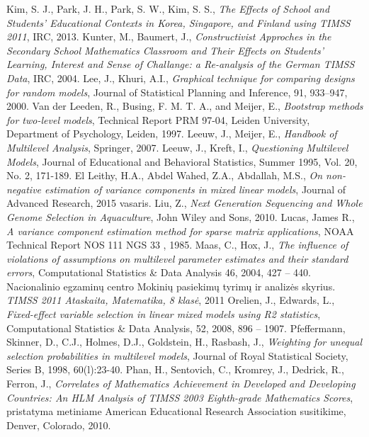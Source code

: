 \documentclass[12pt,a4paper]{article}
\begin{document}
\begin{thebibliography}{1}
 Kim, S. J., Park, J. H., Park, S. W., Kim, S. S., \textit{The Effects of School and Students’ Educational Contexts in Korea, Singapore, and Finland using TIMSS 2011}, IRC, 2013.
 Kunter, M., Baumert, J., \textit{Constructivist Approches in the Secondary School Mathematics Classroom and Their Effects on Students' Learning, Interest and Sense of Challange: a Re-analysis of the German TIMSS Data}, IRC, 2004.
Lee, J., Khuri, A.I., \textit{Graphical technique for comparing designs for random models}, Journal of Statistical Planning and Inference, 91,  933–947, 2000.
 Van der Leeden, R., Busing, F. M. T. A., and Meijer, E., \textit{Bootstrap methods for two-level models}, Technical Report PRM 97-04, Leiden University, Department of Psychology, Leiden, 1997.
 Leeuw, J., Meijer, E., \textit{Handbook of Multilevel Analysis}, Springer, 2007.
 Leeuw, J., Kreft, I., \textit{Questioning Multilevel Models}, Journal of Educational and Behavioral Statistics, Summer 1995, Vol. 20, No. 2, 171-189.
 El  Leithy,  H.A.,  Abdel  Wahed,  Z.A.,  Abdallah,  M.S.,  \textit{On  non-negative  estimation  of
variance components in mixed linear models}, Journal of Advanced Research, 2015 vasaris.
 Liu, Z., \textit{Next Generation Sequencing and Whole Genome Selection in Aquaculture}, John Wiley and Sons, 2010.
Lucas, James R., \textit{A variance component estimation method for sparse matrix applications}, NOAA Technical Report NOS 111 NGS 33 , 1985.
 Maas, C., Hox, J., \textit{The influence of violations of assumptions on multilevel parameter estimates and their standard errors}, Computational Statistics \& Data Analysis 46, 2004, 427 – 440.
 Nacionalinio egzaminų centro Mokinių pasiekimų tyrimų ir analizės skyrius. \textit{TIMSS 2011 Ataskaita, Matematika, 8 klasė}, 2011
 Orelien, J., Edwards, L., \textit{Fixed-effect variable selection in linear mixed models using R2 statistics}, Computational Statistics \& Data Analysis, 52, 2008, 896 – 1907.
 Pfeffermann, Skinner, D., C.J., Holmes, D.J., Goldstein, H., Rasbash, J., \textit{Weighting for unequal selection probabilities in multilevel models}, Journal of Royal Statistical Society, Series B, 1998, 60(l):23-40.
 Phan, H., Sentovich, C., Kromrey, J., Dedrick, R., Ferron, J., \textit{Correlates of Mathematics Achievement in Developed and Developing Countries: An HLM Analysis of TIMSS 2003 Eighth-grade Mathematics Scores}, pristatyma metiniame American Educational Research Association susitikime, Denver, Colorado, 2010.

\end{thebibliography}
\end{document}
